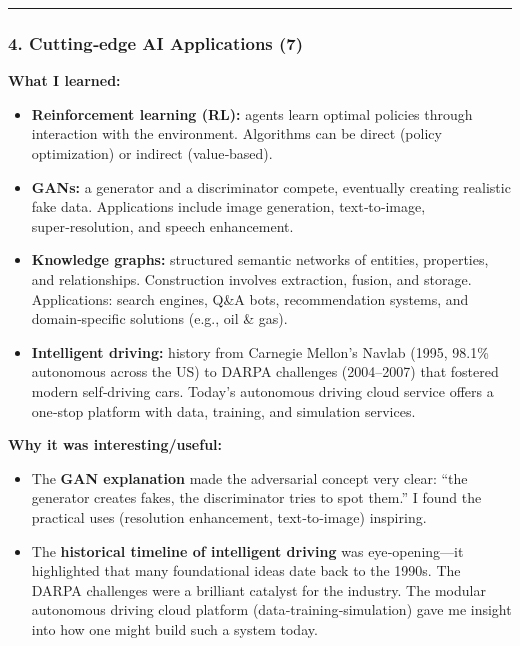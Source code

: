 \begin{center}\rule{0.5\linewidth}{0.5pt}\end{center}

\hypertarget{cuttingedge-ai-applications-7}{%
\subsubsection{4. Cutting‑edge AI Applications
(7)}\label{cuttingedge-ai-applications-7}}

\textbf{What I learned:}

\begin{itemize}
\tightlist
\item
  \textbf{Reinforcement learning (RL):} agents learn optimal policies
  through interaction with the environment. Algorithms can be direct
  (policy optimization) or indirect (value‑based).
\item
  \textbf{GANs:} a generator and a discriminator compete, eventually
  creating realistic fake data. Applications include image generation,
  text‑to‑image, super‑resolution, and speech enhancement.
\item
  \textbf{Knowledge graphs:} structured semantic networks of entities,
  properties, and relationships. Construction involves extraction,
  fusion, and storage. Applications: search engines, Q\&A bots,
  recommendation systems, and domain‑specific solutions (e.g., oil \&
  gas).
\item
  \textbf{Intelligent driving:} history from Carnegie Mellon's Navlab
  (1995, 98.1\% autonomous across the US) to DARPA challenges
  (2004--2007) that fostered modern self‑driving cars. Today's
  autonomous driving cloud service offers a one‑stop platform with data,
  training, and simulation services.
\end{itemize}

\textbf{Why it was interesting/useful:}

\begin{itemize}
\tightlist
\item
  The \textbf{GAN explanation} made the adversarial concept very clear:
  ``the generator creates fakes, the discriminator tries to spot them.''
  I found the practical uses (resolution enhancement, text‑to‑image)
  inspiring.
\item
  The \textbf{historical timeline of intelligent driving} was
  eye‑opening---it highlighted that many foundational ideas date back to
  the 1990s. The DARPA challenges were a brilliant catalyst for the
  industry. The modular autonomous driving cloud platform
  (data‑training‑simulation) gave me insight into how one might build
  such a system today.
\end{itemize}

